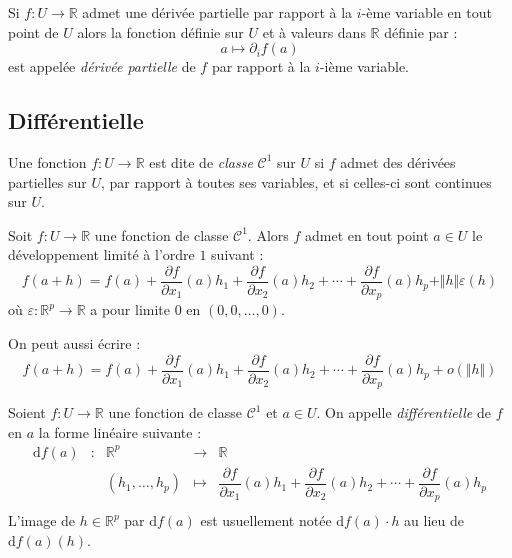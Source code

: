 \documentclass[french,11pt,twoside]{VcCours}
\begin{document}
\begin{Definition}{} Si $f : U \rightarrow \mathbb{R}$ admet une dérivée partielle par rapport à la $i$-ème variable en tout point de $U$ alors la fonction définie sur $U$ et à valeurs dans $\mathbb{R}$ définie par :
$$ a \mapsto \partial_i f(a)$$
est appelée \emph{dérivée partielle} de $f$ par rapport à la $i$-ième variable.
\end{Definition}

\subsection{Différentielle}

\begin{Definition}{} Une fonction $f : U \rightarrow \mathbb{R}$ est dite de \emph{classe} $\mathcal{C}^1$ sur $U$ si $f$ admet des dérivées partielles sur $U$, par rapport à toutes ses variables, et si celles-ci sont continues sur $U$.
\end{Definition}

\begin{Theoreme}{} Soit $f: U \rightarrow \mathbb{R}$ une fonction de classe $\mathcal{C}^1$. Alors $f$ admet en tout point $a \in U$ le développement limité à l'ordre $1$ suivant :
$$ f(a+h) = f(a) + \dfrac{\partial f}{\partial x_1}(a) h_1 + \dfrac{\partial f}{\partial x_2}(a) h_2 + \cdots + \dfrac{\partial f}{\partial x_p}(a) h_p + \Vert h \Vert \varepsilon(h)$$
où $\varepsilon : \mathbb{R}^p \rightarrow \mathbb{R}$ a pour limite $0$ en $(0, 0, \ldots,0)$.
\end{Theoreme}

\begin{Remarque}{} On peut aussi écrire :
$$ f(a+h) = f(a) + \dfrac{\partial f}{\partial x_1}(a) h_1 + \dfrac{\partial f}{\partial x_2}(a) h_2 + \cdots + \dfrac{\partial f}{\partial x_p}(a) h_p + o(\Vert h \Vert)$$
\end{Remarque}

\begin{Definition}{} Soient $f : U \rightarrow \mathbb{R}$ une fonction de classe $\mathcal{C}^1$ et $a \in U$. On appelle \emph{différentielle} de $f$ en $a$ la forme linéaire suivante :
$$ \begin{array}{cccll}
\textrm{d}f(a) & : & \mathbb{R}^p & \rightarrow & \mathbb{R} \\
& & (h_1, \ldots, h_p) & \mapsto & \dfrac{\partial f}{\partial x_1}(a) h_1 + \dfrac{\partial f}{\partial x_2}(a) h_2 + \cdots + \dfrac{\partial f}{\partial x_p}(a) h_p \\
\end{array}$$
L'image de $h \in \mathbb{R}^p$ par $\textrm{d}f(a)$ est usuellement notée $\textrm{d}f(a) \cdot h$ au lieu de $\textrm{d}f(a)(h)$.
\end{Definition}
\end{document}
